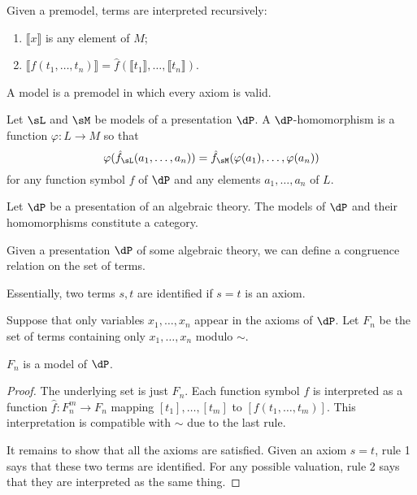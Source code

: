 \documentclass{amsart}
\newcommand{\interp}[1]{\llbracket #1 \rrbracket}
\begin{document}
Given a premodel, terms are interpreted recursively:
\begin{enumerate}
\item $\interp{x}$ is any element of $M$;
\item $\interp{f(t_{1},\ldots,t_{n})} = \hat{f}(\interp{t_{1}},\ldots,\interp{t_{n}})$.
\end{enumerate}

A model is a premodel in which every axiom is valid.

\begin{defn}
  Let $\sL$ and $\sM$ be models of a presentation $\dP$.
  A $\dP$-homomorphism is a function $\varphi : L \to M$ so that
  \[
    \varphi(\hat{f}_{\sL}(a_{1},\ldots,a_{n})) = \hat{f}_{\sM}(\varphi(a_{1}),\ldots,\varphi(a_{n}))
  \]
  for any function symbol $f$ of $\dP$ and any elements $a_{1},\ldots,a_{n}$ of $L$.
\end{defn}

\begin{lem}
  Let $\dP$ be a presentation of an algebraic theory.
  The models of $\dP$ and their homomorphisms constitute a category.
\end{lem}

Given a presentation $\dP$ of some algebraic theory, we can define a congruence relation on the set of terms.
Essentially, two terms $s,t$ are identified if $s = t$ is an axiom.

Suppose that only variables $x_{1},\ldots,x_{n}$ appear in the axioms of $\dP$.
Let $F_{n}$ be the set of terms containing only $x_{1},\ldots,x_{n}$ modulo $\sim$.

\begin{lem}
  $F_{n}$ is a model of $\dP$.
\end{lem}
\begin{proof}
  The underlying set is just $F_{n}$.
  Each function symbol $f$ is interpreted as a function $\hat{f} : F_{n}^{m} \to F_{n}$ mapping $[t_{1}],\ldots,[t_{m}]$ to $[f(t_{1},\ldots,t_{m})]$.
  This interpretation is compatible with $\sim$ due to the last rule.

  It remains to show that all the axioms are satisfied.
  Given an axiom $s = t$, rule 1 says that these two terms are identified.
  For any possible valuation, rule 2 says that they are interpreted as the same thing.
\end{proof}
\end{document}
